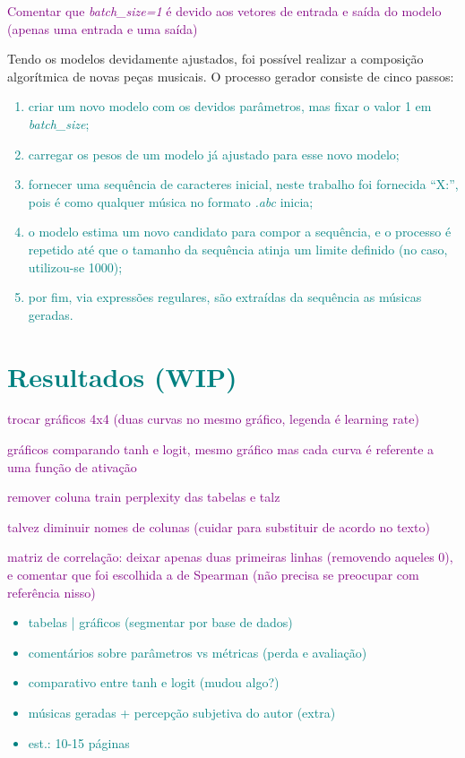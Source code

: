 \documentclass{automatextcc}
\newcommand{\obs}[1]{\textcolor{purple}{#1}}
\newcommand{\nico}[1]{\textcolor{teal}{#1}}
\begin{document}
\obs{Comentar que \textit{batch\_size=1} é devido aos vetores de entrada e saída do modelo (apenas uma entrada e uma saída)}

Tendo os modelos devidamente ajustados, foi possível realizar a composição algorítmica de novas peças musicais. O processo gerador consiste de cinco passos:
\nico{
\begin{enumerate}
    \item criar um novo modelo com os devidos parâmetros, mas fixar o valor 1 em \textit{batch\_size}; 
    \item carregar os pesos de um modelo já ajustado para esse novo modelo;
    \item fornecer uma sequência de caracteres inicial, neste trabalho foi fornecida ``X:'', pois é como qualquer música no formato \textit{.abc} inicia;
    \item o modelo estima um novo candidato para compor a sequência, e o processo é repetido até que o tamanho da sequência atinja um limite definido (no caso, utilizou-se 1000);
    \item por fim, via expressões regulares, são extraídas da sequência as músicas geradas.
\end{enumerate}
}

\chapter{\nico{Resultados (WIP)}}

\obs{trocar gráficos 4x4 (duas curvas no mesmo gráfico, legenda é learning rate)}

\obs{gráficos comparando tanh e logit, mesmo gráfico mas cada curva é referente a uma função de ativação}

\obs{remover coluna train perplexity das tabelas e talz}

\obs{talvez diminuir nomes de colunas (cuidar para substituir de acordo no texto)}

\obs{matriz de correlação: deixar apenas duas primeiras linhas (removendo aqueles 0), e comentar que foi escolhida a de Spearman (não precisa se preocupar com referência nisso)}

\nico{
\begin{itemize}
    \item tabelas | gráficos (segmentar por base de dados)
    \item comentários sobre parâmetros vs métricas (perda e avaliação)
    \item comparativo entre tanh e logit (mudou algo?)
    \item músicas geradas + percepção subjetiva do autor (extra)
    \item est.: 10-15 páginas 
\end{itemize}
}
\end{document}
